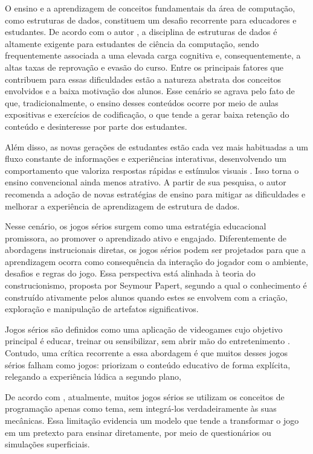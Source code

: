 O ensino e a aprendizagem de conceitos fundamentais da área de computação, como
estruturas de dados, constituem um desafio recorrente para educadores e
estudantes. De acordo com o autor \cite{mtaho2024difficulties}, a disciplina de
estruturas de dados é altamente exigente para estudantes de ciência da
computação, sendo frequentemente associada a uma elevada carga cognitiva e,
consequentemente, a altas taxas de reprovação e evasão do curso. Entre os
principais fatores que contribuem para essas dificuldades estão a natureza
abstrata dos conceitos envolvidos e a baixa motivação dos alunos. Esse cenário
se agrava pelo fato de que, tradicionalmente, o ensino desses conteúdos ocorre
por meio de aulas expositivas e exercícios de codificação, o que tende a gerar
baixa retenção do conteúdo e desinteresse por parte dos estudantes.

Além disso, as novas gerações de estudantes estão cada vez mais habituadas a um
fluxo constante de informações e experiências interativas, desenvolvendo um
comportamento que valoriza respostas rápidas e estímulos visuais . Isso torna o ensino convencional ainda menos atrativo. A partir de sua
pesquisa, o autor \cite{mtaho2024difficulties} recomenda a adoção de novas
estratégias de ensino para mitigar as dificuldades e melhorar a experiência
de aprendizagem de estrutura de dados.

Nesse cenário, os jogos sérios surgem como uma estratégia educacional
promissora, ao promover o aprendizado ativo e engajado. Diferentemente de
abordagens instrucionais diretas, os jogos sérios podem ser projetados para que
a aprendizagem ocorra como consequência da interação do jogador com o ambiente,
desafios e regras do jogo. Essa perspectiva está alinhada à teoria do
construcionismo, proposta por Seymour Papert, segundo a qual o conhecimento é
construído ativamente pelos alunos quando estes se envolvem com a criação,
exploração e manipulação de artefatos significativos.

Jogos sérios são definidos como uma aplicação de videogames cujo objetivo
principal é educar, treinar ou sensibilizar, sem abrir mão do entretenimento
\cite{mouaheb2012serious}. Contudo, uma crítica recorrente a essa abordagem é
que muitos desses jogos sérios falham como jogos: priorizam o conteúdo educativo de
forma explícita, relegando a experiência lúdica a segundo plano, 

De acordo com \cite{de2025codebo}, atualmente, muitos jogos sérios se utilizam
os conceitos de programação apenas como tema, sem integrá-los verdadeiramente
às suas mecânicas. Essa limitação evidencia um modelo que tende a transformar o
jogo em um pretexto para ensinar diretamente, por meio de  questionários ou simulações superficiais.

